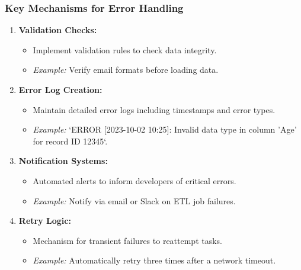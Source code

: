 \documentclass[aspectratio=169]{beamer}
\begin{document}
\begin{frame}[fragile]
    \frametitle{Key Mechanisms for Error Handling}
    \begin{enumerate}
        \item \textbf{Validation Checks:}
        \begin{itemize}
            \item Implement validation rules to check data integrity.
            \item \textit{Example:} Verify email formats before loading data.
        \end{itemize}
        
        \item \textbf{Error Log Creation:}
        \begin{itemize}
            \item Maintain detailed error logs including timestamps and error types.
            \item \textit{Example:} `ERROR [2023-10-02 10:25]: Invalid data type in column 'Age' for record ID 12345`.
        \end{itemize}

        \item \textbf{Notification Systems:}
        \begin{itemize}
            \item Automated alerts to inform developers of critical errors.
            \item \textit{Example:} Notify via email or Slack on ETL job failures.
        \end{itemize}

        \item \textbf{Retry Logic:}
        \begin{itemize}
            \item Mechanism for transient failures to reattempt tasks.
            \item \textit{Example:} Automatically retry three times after a network timeout.
        \end{itemize}
    \end{enumerate}
\end{frame}
\end{document}
